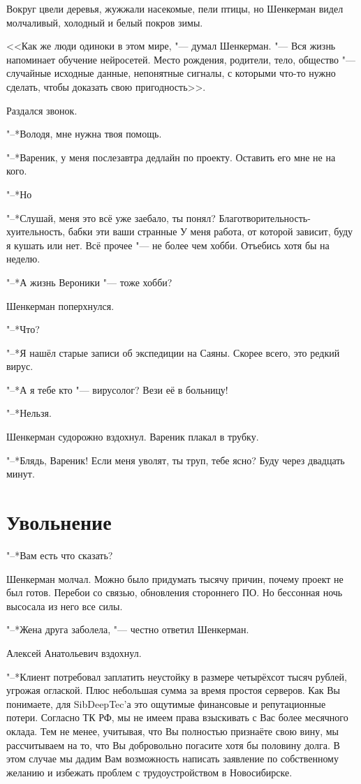 Вокруг цвели деревья, жужжали насекомые, пели птицы, но Шенкерман видел молчаливый, холодный и белый покров зимы.

<<Как же люди одиноки в этом мире, "--- думал Шенкерман.
"--- Вся жизнь напоминает обучение нейросетей.
Место рождения, родители, тело, общество "--- случайные исходные данные, непонятные сигналы, с которыми что-то нужно сделать, чтобы доказать свою пригодность>>.

Раздался звонок.

"--*Володя, мне нужна твоя помощь.

"--*Вареник, у меня послезавтра дедлайн по проекту.
Оставить его мне не на кого.

"--*Но\ldotst

"--*Слушай, меня это всё уже заебало, ты понял?
Благотворительность-хуительность, бабки эти ваши странные\ldotst
У меня работа, от которой зависит, буду я кушать или нет.
Всё прочее "--- не более чем хобби.
Отъебись хотя бы на неделю.

"--*А жизнь Вероники "--- тоже хобби?

Шенкерман поперхнулся.

"--*Что?

"--*Я нашёл старые записи об экспедиции на Саяны.
Скорее всего, это редкий вирус.

"--*А я тебе кто "--- вирусолог?
Вези её в больницу!

"--*Нельзя.

Шенкерман судорожно вздохнул.
Вареник плакал в трубку.

"--*Блядь, Вареник!
Если меня уволят, ты труп, тебе ясно?
Буду через двадцать минут.

\section{Увольнение}

"--*Вам есть что сказать?

Шенкерман молчал.
Можно было придумать тысячу причин, почему проект не был готов.
Перебои со связью, обновления стороннего ПО.
Но бессонная ночь высосала из него все силы.

"--*Жена друга заболела, "--- честно ответил Шенкерман.

Алексей Анатольевич вздохнул.

"--*Клиент потребовал заплатить неустойку в размере четырёхсот тысяч рублей, угрожая оглаской.
Плюс небольшая сумма за время простоя серверов.
Как Вы понимаете, для SibDeepTec'а это ощутимые финансовые и репутационные потери.
Согласно ТК РФ, мы не имеем права взыскивать с Вас более месячного оклада.
Тем не менее, учитывая, что Вы полностью признаёте свою вину, мы рассчитываем на то, что Вы добровольно погасите хотя бы половину долга.
В этом случае мы дадим Вам возможность написать заявление по собственному желанию и избежать проблем с трудоустройством в Новосибирске.

